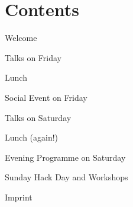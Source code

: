 \section*{Contents}

\noindent Welcome \hfill \pageref{welcome}

\vspace*{0.35em}%
\noindent Talks on Friday \hfill \pageref{friday}

\vspace*{0.35em}%
\noindent Lunch \hfill \pageref{lunch}

\vspace*{0.35em}%
\noindent Social Event on Friday \hfill \pageref{social-event}

\vspace*{0.35em}%
\noindent Talks on Saturday \hfill \pageref{saturday}

\vspace*{0.35em}%
\noindent Lunch (again!)\hfill \pageref{lunch}

\vspace*{0.35em}%
\noindent Evening Programme on Saturday\hfill \pageref{kuehler-krug}

\vspace*{0.35em}%
\noindent Sunday Hack Day and Workshops \hfill \pageref{sunday}

\vspace*{0.35em}%
\noindent Imprint \hfill \pageref{imprint}\\
